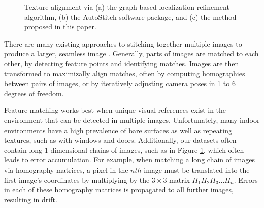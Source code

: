 \documentclass[]{spie}  %
\begin{document}
\begin{figure}
  \centering {}

  \centering {}

  \centering {}

  \caption{Texture alignment via (a) the graph-based localization
    refinement algorithm, (b) the AutoStitch software package, and (c)
    the method proposed in this paper.}
  \label{fig:mosaic3D}
\end{figure}

There are many existing approaches to stitching together multiple
images to produce a larger, seamless image \cite{szeliski2006image,
  agarwalapanoramas, wangmultipleviews, coorg1997matching,
  debevechybrid, bernardinimultiplescans}. Generally, parts of images
are matched to each other, by detecting feature points and identifying
matches. Images are then transformed to maximizally align matches,
often by computing homographies between pairs of images, or by
iteratively adjusting camera poses in 1 to 6 degrees of freedom.

Feature matching works best when unique visual references exist in the
environment that can be detected in multiple images. Unfortunately,
many indoor environments have a high prevalence of bare surfaces as
well as repeating textures, such as with windows and
doors. Additionally, our datasets often contain long 1-dimensional
chains of images, such as in Figure \ref{fig:mosaic3D}, which often
leads to error accumulation. For example, when matching a long chain
of images via homography matrices, a pixel in the $nth$ image must be
translated into the first image's coordinates by multiplying by the
$3\times3$ matrix $H_1 H_2 H_3 ... H_n$. Errors in each of these
homography matrices is propagated to all further images, resulting in
drift.
\end{document}
